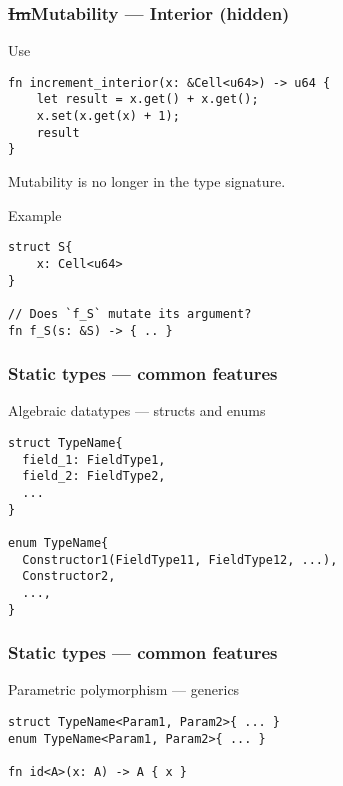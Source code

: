 \documentclass[t]{beamer}
\begin{document}
\begin{frame}[fragile]
\frametitle{\st{Im}Mutability --- Interior (hidden)}

\begin{block}{Use}
\begin{verbatim}
fn increment_interior(x: &Cell<u64>) -> u64 {
    let result = x.get() + x.get();
    x.set(x.get(x) + 1);
    result
}
\end{verbatim}
\end{block}

Mutability is no longer in the type signature.

\begin{block}{Example}
\begin{verbatim}
struct S{
    x: Cell<u64>
}

// Does `f_S` mutate its argument?
fn f_S(s: &S) -> { .. }
\end{verbatim}
\end{block}

\end{frame}


\begin{frame}[c,fragile]
\begin{center}
\end{center}
\end{frame}


\begin{frame}[c,fragile]
\frametitle{Static types --- common features}

\begin{block}{Algebraic datatypes --- structs and enums}
\begin{verbatim}
struct TypeName{
  field_1: FieldType1,
  field_2: FieldType2,
  ...
}

enum TypeName{
  Constructor1(FieldType11, FieldType12, ...),
  Constructor2,
  ...,
}
\end{verbatim}
\end{block}

\end{frame}


\begin{frame}[c,fragile]
\frametitle{Static types --- common features}

\begin{block}{Parametric polymorphism --- generics}
\begin{verbatim}
struct TypeName<Param1, Param2>{ ... }
enum TypeName<Param1, Param2>{ ... }

fn id<A>(x: A) -> A { x }
\end{verbatim}
\end{block}

\end{frame}
\end{document}
